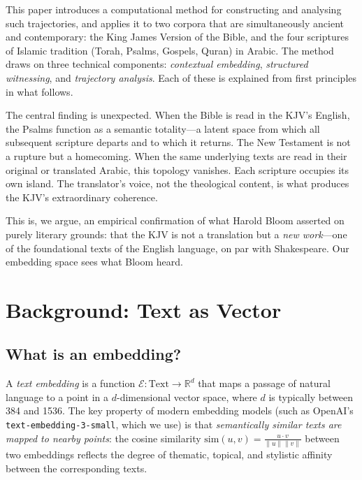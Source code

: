\documentclass[11pt,a4paper]{article}
\theoremstyle{definition}
\begin{document}
This paper introduces a computational method for constructing and analysing such trajectories, and applies it to two corpora that are simultaneously ancient and contemporary: the King James Version of the Bible, and the four scriptures of Islamic tradition (Torah, Psalms, Gospels, Quran) in Arabic. The method draws on three technical components: \emph{contextual embedding}, \emph{structured witnessing}, and \emph{trajectory analysis}. Each of these is explained from first principles in what follows.

The central finding is unexpected. When the Bible is read in the KJV's English, the Psalms function as a semantic totality---a latent space from which all subsequent scripture departs and to which it returns. The New Testament is not a rupture but a homecoming. When the same underlying texts are read in their original or translated Arabic, this topology vanishes. Each scripture occupies its own island. The translator's voice, not the theological content, is what produces the KJV's extraordinary coherence.

This is, we argue, an empirical confirmation of what Harold Bloom asserted on purely literary grounds: that the KJV is not a translation but a \emph{new work}---one of the foundational texts of the English language, on par with Shakespeare. Our embedding space sees what Bloom heard.


\section{Background: Text as Vector}

\subsection{What is an embedding?}

A \emph{text embedding} is a function $\mathcal{E}: \text{Text} \to \mathbb{R}^d$ that maps a passage of natural language to a point in a $d$-dimensional vector space, where $d$ is typically between 384 and 1536. The key property of modern embedding models (such as OpenAI's \texttt{text-embedding-3-small}, which we use) is that \emph{semantically similar texts are mapped to nearby points}: the cosine similarity $\text{sim}(u,v) = \frac{u \cdot v}{\|u\|\|v\|}$ between two embeddings reflects the degree of thematic, topical, and stylistic affinity between the corresponding texts.
\end{document}
